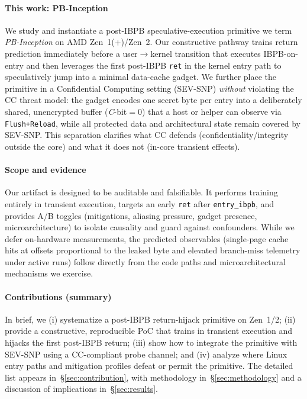 \documentclass[11pt,a4paper]{article}
\begin{document}
\paragraph{This work: PB-Inception}
We study and instantiate a post-IBPB speculative-execution primitive we term \emph{PB-Inception} on AMD Zen~1(+)/Zen~2. Our constructive pathway trains return prediction immediately before a user$\rightarrow$kernel transition that executes IBPB-on-entry and then leverages the first post-IBPB \texttt{ret} in the kernel entry path to speculatively jump into a minimal data-cache gadget. We further place the primitive in a Confidential Computing setting (SEV-SNP) \emph{without} violating the CC threat model: the gadget encodes one secret byte per entry into a deliberately shared, unencrypted buffer (\emph{C}-bit$=0$) that a host or helper can observe via \texttt{Flush+Reload}, while all protected data and architectural state remain covered by SEV-SNP. This separation clarifies what CC defends (confidentiality/integrity outside the core) and what it does not (in-core transient effects).

\paragraph{Scope and evidence}
Our artifact is designed to be auditable and falsifiable. It performs training entirely in transient execution, targets an early \texttt{ret} after \texttt{entry\_ibpb}, and provides A/B toggles (mitigations, aliasing pressure, gadget presence, microarchitecture) to isolate causality and guard against confounders. While we defer on-hardware measurements, the predicted observables (single-page cache hits at offsets proportional to the leaked byte and elevated branch-miss telemetry under active runs) follow directly from the code paths and microarchitectural mechanisms we exercise.

\paragraph{Contributions (summary)}
In brief, we (i) systematize a post-IBPB return-hijack primitive on Zen~1/2; (ii) provide a constructive, reproducible PoC that trains in transient execution and hijacks the first post-IBPB return; (iii) show how to integrate the primitive with SEV-SNP using a CC-compliant probe channel; and (iv) analyze where Linux entry paths and mitigation profiles defeat or permit the primitive. The detailed list appears in~\S\ref{sec:contribution}, with methodology in~\S\ref{sec:methodology} and a discussion of implications in~\S\ref{sec:results}.
\end{document}
